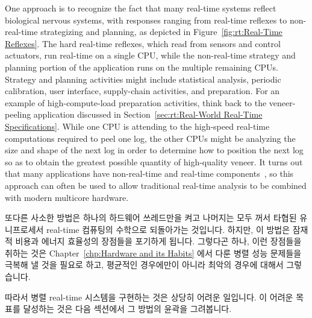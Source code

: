 One approach is to recognize the fact that many real-time systems
reflect biological nervous systems, with responses ranging from
real-time reflexes to non-real-time strategizing and planning,
as depicted in
Figure~\ref{fig:rt:Real-Time Reflexes}.
The hard real-time reflexes, which read from sensors and control
actuators, run real-time on a single CPU, while the non-real-time
strategy and planning portion of the application runs on the multiple
remaining CPUs.
Strategy and planning activities might include statistical analysis,
periodic calibration, user interface, supply-chain activities, and
preparation.
For an example of high-compute-load preparation activities, think back
to the veneer-peeling application discussed in
Section~\ref{sec:rt:Real-World Real-Time Specifications}.
While one CPU is attending to the high-speed real-time computations
required to peel one log, the other CPUs might be analyzing the size
and shape of the next log in order to determine how to position the
next log so as to obtain the greatest possible quantity of high-quality
veneer.
It turns out that many applications have non-real-time and real-time
components~\cite{RobertBerry2008IBMSysJ}, so this approach can
often be used to allow traditional real-time analysis to be combined
with modern multicore hardware.
\fi

또다른 사소한 방법은 하나의 하드웨어 쓰레드만을 켜고 나머지는 모두 꺼서 타협된
유니프로세서 real-time 컴퓨팅의 수학으로 되돌아가는 것입니다.
하지만, 이 방법은 잠재적 비용과 에너지 효율성의 장점들을 포기하게 됩니다.
그렇다곤 하나, 이런 장점들을 취하는 것은
Chapter~\ref{chp:Hardware and its Habits} 에서 다룬 병렬 성능 문제들을 극복해
낼 것을 필요로 하고, 평균적인 경우에만이 아니라 최악의 경우에 대해서
그렇습니다.

따라서 병렬 real-time 시스템을 구현하는 것은 상당히 어려운 일입니다.
이 어려운 목표를 달성하는 것은 다음 섹션에서 그 방법의 윤곽을 그려봅니다.

